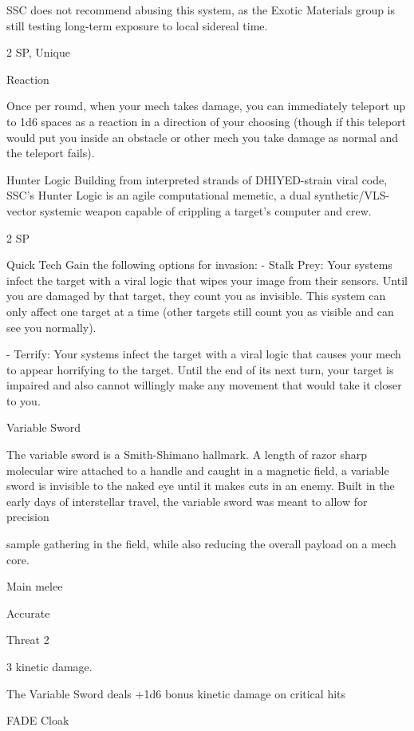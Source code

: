 SSC does not recommend abusing this system, as the Exotic Materials group is still testing long-term  
exposure to local sidereal time.  

2 SP, Unique
 
Reaction
 
Once per round, when your mech takes damage, you can immediately teleport up to 1d6 spaces  
as a reaction in a direction of your choosing (though if this teleport would put you inside an  
obstacle or other mech you take damage as normal and the teleport fails).
 

Hunter Logic  
Building from interpreted strands of DHIYED-strain viral code, SSC’s Hunter Logic is an agile computational  
memetic, a dual synthetic/VLS-vector systemic weapon capable of crippling a target’s computer and crew.  

2 SP
 

Quick Tech  
Gain the following options for invasion:  
         - Stalk Prey: Your systems infect the target with a viral logic that wipes your image from  
their sensors. Until you are damaged by that target, they count you as invisible. This system can  
only affect one target at a time (other targets still count you as visible and can see you normally).
 
	        - Terrify: Your systems infect the target with a viral logic that causes your mech to appear  
horrifying to the target. Until the end of its next turn, your target is impaired and also cannot  
willingly make any movement that would take it closer to you.
 

Variable Sword  

The variable sword is a Smith-Shimano hallmark. A length of razor sharp molecular wire attached to a  
handle and caught in a magnetic field, a variable sword is invisible to the naked eye until it makes cuts in an  
enemy. Built in the early days of interstellar travel, the variable sword was meant to allow for precision  

sample gathering in the field, while also reducing the overall payload on a mech core.   

Main melee
 
Accurate
 
Threat 2
 
3 kinetic damage.
 
The Variable Sword deals +1d6 bonus kinetic damage on critical hits
 

FADE Cloak  

                                                                                                                


